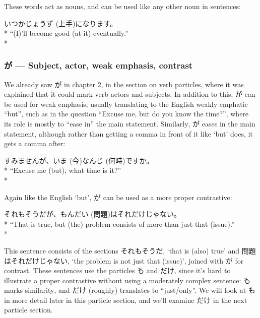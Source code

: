 \documentclass[11pt, b5paper, twoside, openright, onecolumn]{book}
\makeatletter
\newcommand*{\rubystack}[2]{{\relscale{0.5}%
  \begin{tabular}[b]{@{}c@{}}%
    {#1}\\%
   {\textscale{2}{#2}}%
  \end{tabular}}%
}
\DeclareRobustCommand*{\ruby}[2]{%
  \mbox{%
    \setlength{\parskip}{0ex}%
    \BeginAccSupp{method=pdfstringdef,ActualText={#1}}%
      \rubystack{\phantom{#2}}{#1}%
      \llap{%
        \rubystack{#2}{\phantom{#1}}%
      }%
    \EndAccSupp{}%
  }%
}
\renewcommand*{\ruby}[2]{#2 (#1)}%
\newenvironment{exampleblock}{
\setlength{\parindent}{0.6in}
\begin{minipage}[t]{\dimexpr\textwidth-\parindent}}
{\end{minipage}}
\makeatother
\begin{document}
These words act as nouns‚ and can be used like any other noun in sentences:

\vspace{0.4cm}
\begin{exampleblock}
いつか\ruby{上手}{じょうず}になります。 \\* 
“(I)’ll become good (at it) eventually.” \\* 
\end{exampleblock}
\subsubsection{が — Subject‚ actor‚ weak emphasis‚ contrast}


We already saw が in chapter 2‚ in the section on verb particles‚ where it was explained that it could mark verb actors and subjects. In addition to this‚ が can be used for weak emphasis‚ usually translating to the English weakly emphatic “but”‚ such as in the question “Excuse me‚ but do you know the time?”‚ where its role is mostly to “ease in” the main statement. Similarly‚ が eases in the main statement‚ although rather than getting a comma in front of it like ‘but’ does‚ it gets a comma after:

\vspace{0.4cm}
\begin{exampleblock}
すみませんが、\ruby{今}{いま}\ruby{何時}{なんじ}ですか。 \\* 
“Excuse me (but)‚ what time is it?” \\* 
\end{exampleblock}
\vspace{0.2cm}

Again like the English ‘but’‚ が can be used as a more proper contrastive:

\vspace{0.4cm}
\begin{exampleblock}
それもそうだが、\ruby{問題}{もんだい}はそれだけじゃない。 \\* 
“That is true‚ but (the) problem consists of more than just that (issue).” \\* 
\end{exampleblock}
\vspace{0.2cm}

This sentence consists of the sections それもそうだ‚ ‘that is (also) true’ and 問題はそれだけじゃない‚ ‘the problem is not just that (issue)’‚ joined with が for contrast. These sentences use the particles も and だけ‚ since it’s hard to illustrate a proper contrastive without using a moderately complex sentence: も marks similarity‚ and だけ (roughly) translates to “just/only”. We will look at も in more detail later in this particle section‚ and we’ll examine だけ in the next particle section.
\end{document}
